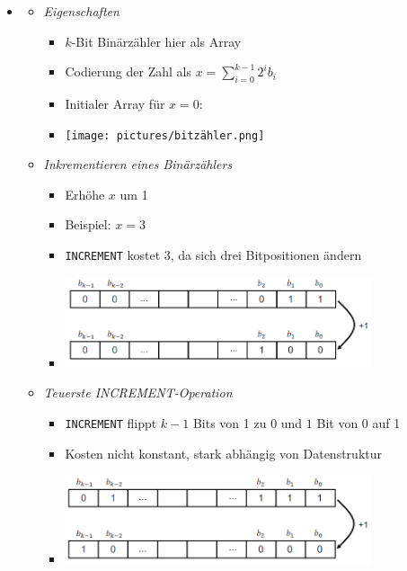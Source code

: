 \documentclass[
    12pt,
    a4paper,
    ngerman,
    color=3b,%
    marginpar=false,
    colorback=false,
    leqno,
]{tudaexercise}
\begin{document}
\begin{itemize}
        \item {}
            \begin{itemize}
                \item \textit{Eigenschaften}
                    \begin{itemize}
                        \item $k$-Bit Binärzähler hier als Array
                        \item Codierung der Zahl als $x=\sum^{k-1}_{i=0}2^i b_i$
                        \item Initialer Array für $x = 0$:
                        \vspace*{-.3cm}
                        \item[] \texttt{[image: pictures/bitzähler.png]}
                    \end{itemize}
                    \vspace*{-.8cm}
                \item \textit{Inkrementieren eines Binärzählers}
                    \begin{itemize}
                        \item Erhöhe $x$ um 1 
                        \item Beispiel: $x=3$
                        \item \texttt{INCREMENT} kostet 3, da sich drei Bitpositionen ändern
                        \item \includegraphics[width=9cm]{pictures/increment.PNG}
                    \end{itemize}
                    \vspace*{-.2cm}
                \item \textit{Teuerste INCREMENT-Operation}
                    \begin{itemize}
                        \item \texttt{INCREMENT} flippt $k-1$ Bits von 1 zu 0 und $1$ Bit von 0 auf 1
                        \item Kosten nicht konstant, stark abhängig von Datenstruktur
                        \item \includegraphics[width=9cm]{pictures/incrementEXP.PNG}

\end{itemize}
\end{itemize}
\end{itemize}
\end{document}
